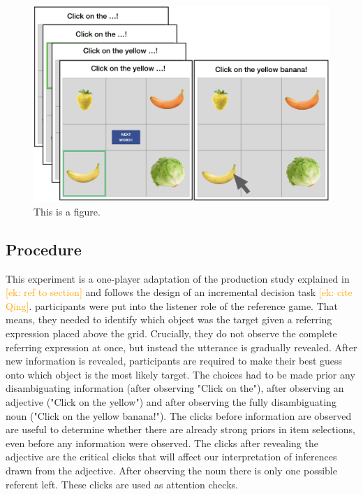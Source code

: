 \documentclass[10pt,letterpaper]{article}
\newcommand{\ek}[1]{\textcolor{Orange}{[ek: #1]}}
\begin{document}
\begin{figure}[H]
	\begin{center}
		\includegraphics[width=.475\textwidth]{graphs/IDT-design.pdf}
	\end{center}
\caption{This is a figure.} 
\label{prod-results}
\end{figure}


\subsection{Procedure}
This experiment is a one-player adaptation of the production study explained in \ek{ref to section} and follows the design of an incremental decision task \ek{cite Qing}. participants were put into the listener role of the reference game. That means, they needed to identify which object was the target given a referring expression placed above the grid. Crucially, they do not observe the complete referring expression at once, but instead the utterance is gradually revealed. After new information is revealed, participants are required to make their best guess onto which object is the most likely target. The choices had to be made prior any disambiguating information (after observing "Click on the"), after observing an adjective ("Click on the yellow") and after observing the fully disambiguating noun ("Click on the yellow banana!"). The clicks before information are observed are useful to determine whether there are already strong priors in item selections, even before any information were observed. The clicks after revealing the adjective are the critical clicks that will affect our interpretation of inferences drawn from the adjective. After observing the noun there is only one possible referent left. These clicks are used as attention checks.
\end{document}
